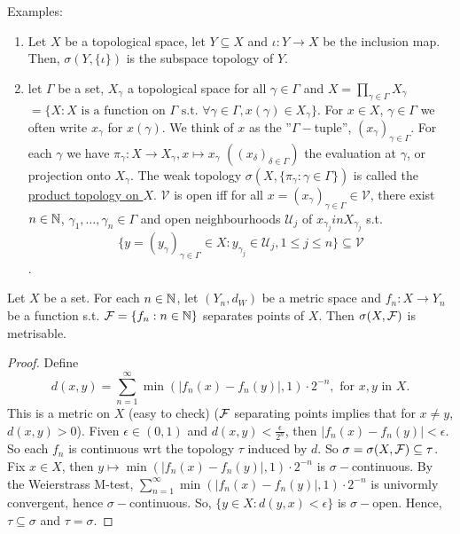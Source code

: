 \documentclass{article}
\begin{document}
\begin{examplesblock}{Examples:}\label{examples: 6}
    \begin{enumerate}
        \item Let $X$ be a topological space, let $Y\subseteq X$ and $\iota : Y\to X$ be the inclusion map. Then, $\sigma(Y, \{\iota\})$ is the subspace topology of $Y$. 
        \item let $\Gamma$ be a set, $X_\gamma$ a topological space for all $\gamma\in\Gamma$ and $X = \displaystyle\prod_{\gamma\in\Gamma}X_\gamma$ $= \{X:X \text{ is a function on } \Gamma \text{ s.t. } \forall \gamma\in\Gamma, x(\gamma)\in X_\gamma \}$. For $x\in X$, $\gamma\in\Gamma$ we often write $x_\gamma$ for $x(\gamma)$. We think of $x$ as the ''$\Gamma-$tuple'', $(x_\gamma)_{\gamma\in\Gamma}$. For each $\gamma$ we have $\pi_\gamma: X\to X_\gamma, x\mapsto x_\gamma$ $((x_\delta)_{\delta\in\Gamma})$ the evaluation at $\gamma$, or projection onto $X_\gamma$. The weak topology $\sigma(X, \{\pi_\gamma:\gamma\in\Gamma\})$ is called the \noindent\underline{product topology on $X$}. $\mathcal{V}$ is open iff for all $x=(x_\gamma)_{\gamma\in\Gamma}\in\mathcal{V}$, there exist $n\in\mathbb{N}$, $\gamma_1,\dots, \gamma_n\in\Gamma$ and open neighbourhoods $\mathcal{U}_j$ of $x_{\gamma_j} in X_{\gamma_j}$ s.t.
        $$\{y=(y_\gamma)_{\gamma\in\Gamma}\in X:y_{\gamma_j}\in\mathcal{U}_j, 1\leq j\leq n\}\subseteq \mathcal{V}
        $$.
    \end{enumerate}
\end{examplesblock}

\begin{boxprop}\label{prop: metrisability of weak topologies}
    Let $X$ be a set. For each $n\in\mathbb{N}$, let $(Y_n, d_W)$ be a metric space and $f_n:X\to Y_n$ be a function s.t. $\mathcal{F} = \{f_n:n\in\mathbb{N}\}$ separates points of $X$. Then $\sigma(X, \mathcal{F})$ is metrisable. 
\end{boxprop}

\begin{proof}
    Define 
    $$
    d(x,y) = \displaystyle\sum^\infty_{n=1}\min(|f_n(x)-f_n(y)|, 1)\cdot 2^{-n}, \text{ for } x,y \text{ in } X. 
    $$
    This is a metric on $X$ (easy to check) ($\mathcal{F}$ separating points implies that for $x\neq y$, $d(x,y)>0$). Fiven $\epsilon\in(0,1)$ and $d(x,y)<\frac{\epsilon}{2^n}$, then $|f_n(x)-f_n(y)|<\epsilon$. So each $f_n$ is continuous wrt the topology $\tau$ induced by $d$. So $\sigma = \sigma(X,\mathcal{F})\subseteq\tau$. Fix $x\in X$, then $y\mapsto \min(|f_n(x)-f_n(y)|, 1)\cdot 2^{-n}$ is $\sigma-$continuous. By the Weierstrass M-test, $\displaystyle\sum^\infty_{n=1}\min(|f_n(x)-f_n(y)|, 1)\cdot 2^{-n}$ is univormly convergent, hence $\sigma-$continuous. So, $\{y\in X: d(y,x)<\epsilon\}$ is $\sigma-$open. Hence, $\tau\subseteq\sigma$ and $\tau = \sigma$.
\end{proof}
\end{document}
